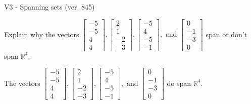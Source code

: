 \begin{exercise}
  \begin{exerciseTitle}V3 - Spanning sets (ver. 845)\end{exerciseTitle}
  \begin{exerciseStatement}
    Explain why the vectors \(\left[\begin{array}{r}
-5 \\
-5 \\
4 \\
4
\end{array}\right] , \left[\begin{array}{r}
2 \\
1 \\
-2 \\
-3
\end{array}\right] , \left[\begin{array}{r}
-5 \\
4 \\
-5 \\
-1
\end{array}\right] , \text{ and } \left[\begin{array}{r}
0 \\
-1 \\
-3 \\
0
\end{array}\right]\) span or don't span \(\mathbb{R}^4\). 
	


  \end{exerciseStatement}
  \begin{exerciseAnswer}
   The vectors \(\left[\begin{array}{r}
-5 \\
-5 \\
4 \\
4
\end{array}\right] , \left[\begin{array}{r}
2 \\
1 \\
-2 \\
-3
\end{array}\right] , \left[\begin{array}{r}
-5 \\
4 \\
-5 \\
-1
\end{array}\right] , \text{ and } \left[\begin{array}{r}
0 \\
-1 \\
-3 \\
0
\end{array}\right]\) 
  	 do  
	span \(\mathbb{R}^4\).
  


  \end{exerciseAnswer}
\end{exercise}